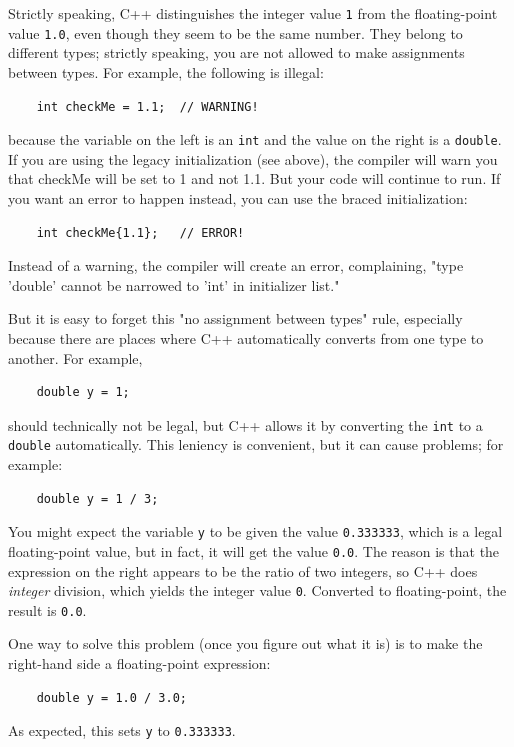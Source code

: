 Strictly speaking, C++ distinguishes the integer value {\tt 1}
from the floating-point value {\tt 1.0}, even though they
seem to be the same number.  They belong to
different types; strictly speaking, you are not allowed
to make assignments between types.  For example, the following
is illegal:

\begin{verbatim}
    int checkMe = 1.1;  // WARNING!
\end{verbatim}
%
because the variable on the left is an {\tt int}
and the value on the right is a {\tt double}. If you are
using the legacy initialization (see above), the compiler
will warn you that checkMe will
be set to 1 and not 1.1. But your code will continue to
run. If you want an error to happen 
instead, you can use the braced initialization:
\begin{verbatim}
    int checkMe{1.1};   // ERROR!
\end{verbatim}
Instead of a warning, the compiler will create an
error, complaining, "type 'double' cannot be narrowed to 'int' in initializer list." 

But it is easy
to forget this "no assignment between types" rule, especially because there are places where C++
automatically converts from one type to another.
For example,

\begin{verbatim}
    double y = 1;
\end{verbatim}
%
should technically not be legal, but C++ allows it by converting the
{\tt int} to a {\tt double} automatically.  This leniency is
convenient, but it can cause problems; for example:

\begin{verbatim}
    double y = 1 / 3;
\end{verbatim}
%
You might expect the variable {\tt y} to be given the value
{\tt 0.333333}, which is a legal floating-point value, but in
fact, it will get the value {\tt 0.0}.  The reason is that the
expression on the right appears to be the ratio of two integers,
so C++ does {\em integer} division, which yields the integer
value {\tt 0}.  Converted to floating-point, the result is
{\tt 0.0}.

One way to solve this problem (once you figure out what
it is) is to make the right-hand side a floating-point
expression:

\begin{verbatim}
    double y = 1.0 / 3.0;
\end{verbatim}
%
As expected, this sets {\tt y} to {\tt 0.333333}.

